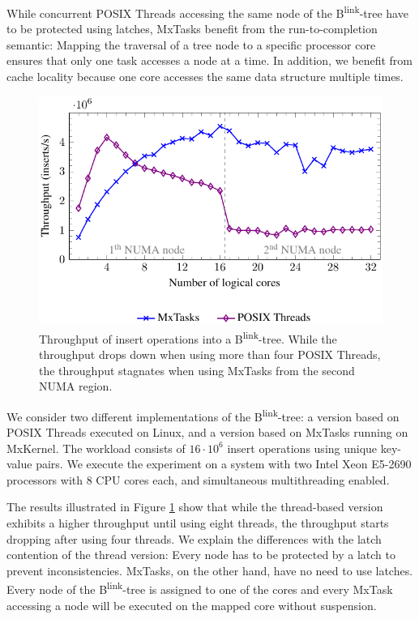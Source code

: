 \documentclass[11pt,dvipdfm]{article}
\begin{document}
While concurrent POSIX Threads accessing the same node of the B\textsuperscript{link}-tree have to be protected using latches, MxTasks benefit from the run-to-completion semantic:
Mapping the traversal of a tree node to a specific processor core ensures that only one task accesses a node at a time.
In addition, we benefit from cache locality because one core accesses the same data structure multiple times.

\begin{figure}
\centering
\includegraphics[bb=0 0 317 211]{figs/figure6.pdf}
\caption{Throughput of insert operations into a B\textsuperscript{link}-tree. While the throughput drops down when using more than four POSIX Threads, the throughput stagnates when using MxTasks from the second NUMA region.}
\label{nollhrm19:fig:blinktree:results}
\end{figure}

We consider two different implementations of the B\textsuperscript{link}-tree: a version based on POSIX Threads executed on Linux, and a version based on MxTasks running on MxKernel.
The workload consists of $16 \cdot 10^6$ insert operations using unique key-value pairs.
We execute the experiment on a system with two Intel Xeon E5-2690 processors with 8 CPU cores each, and simultaneous multithreading enabled.

The results illustrated in Figure \ref{nollhrm19:fig:blinktree:results} show that while the thread-based version exhibits a higher throughput until using eight threads, the throughput starts dropping after using four threads.
We explain the differences with the latch contention of the thread version:
Every node has to be protected by a latch to prevent inconsistencies.
MxTasks, on the other hand, have no need to use latches.
Every node of the B\textsuperscript{link}-tree is assigned to one of the cores and every MxTask accessing a node will be executed on the mapped core without suspension.
\end{document}
